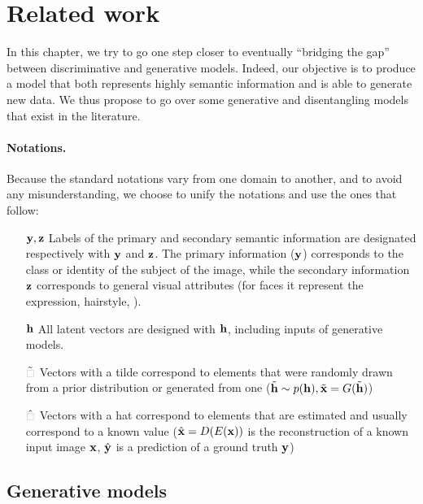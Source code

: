 \section{Related work} \label{dualdis:sec:RW}

In this chapter, we try to go one step closer to eventually ``bridging the gap'' between discriminative and generative models. Indeed, our objective is to produce a model that both represents highly semantic information and is able to generate new data. We thus propose to go over some generative and disentangling models that exist in the literature.

\paragraph{Notations.} Because the standard notations vary from one domain to another, and to avoid any misunderstanding, we choose to unify the notations and use the ones that follow:
\begin{itemize}[leftmargin=2em]
    \item[$\mathbf{y},\mathbf{z}$] Labels of the primary and secondary semantic information are designated respectively with $\mathbf{y}$ and $\mathbf{z}$. The primary information ($\mathbf{y}$) corresponds to the class or identity of the subject of the image, while the secondary information $\mathbf{z}$ corresponds to general visual attributes (\eg for faces it represent the expression, hairstyle, \etc).
    \item[$\mathbf{h}$] All latent vectors are designed with $\mathbf{h}$, including inputs of generative models.
    \item[$\tilde{\textcolor{lightgray}{\boxempty}}$] Vectors with a tilde correspond to elements that were randomly drawn from a prior distribution or generated from one (\eg $\tilde{\mathbf{h}}\sim p(\mathbf{h}), \tilde{\mathbf{x}} = G(\tilde{\mathbf{h}})$)
    \item[$\hat{\textcolor{lightgray}{\boxempty}}$] Vectors with a hat correspond to elements that are estimated and usually correspond to a known value (\eg $\hat{\mathbf{x}}=D(E(\mathbf{x}))$ is the reconstruction of a known input image $\mathbf{x}$, $\hat{\mathbf{y}}$ is a prediction of a ground truth $\mathbf{y}$)
\end{itemize}

\FloatBarrier

\subsection{Generative models}

